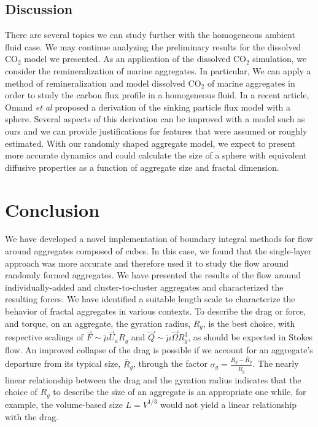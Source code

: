  \subsection{Discussion}
 
 There are several topics we can study further with the homogeneous ambient fluid case. We may continue analyzing the preliminary results for the dissolved CO$_2$ model we presented.
 As an application of the dissolved CO$_2$ simulation, we consider the remineralization of marine aggregates. In particular, We can apply a method of remineralization and model dissolved CO$_2$ of marine aggregates in order to study the carbon flux profile in a homogeneous fluid.
 In a recent article, Omand {\it{et al}} \cite{omand_sinking_2020} proposed a derivation of the sinking particle flux model with a sphere.
 Several aspects of this derivation can be improved with a model such as ours and we can provide justifications for features that were assumed or roughly estimated.
  With our randomly shaped aggregate model, we expect to present more accurate dynamics and could calculate the size of a sphere with equivalent diffusive properties as a function of aggregate size and fractal dimension.
\section{Conclusion}
\label{sec:conclusion}

We have developed a novel implementation of boundary integral methods for flow around aggregates composed of cubes. In this case, we found that the single-layer approach was more accurate and therefore used it to study the flow around randomly formed aggregates.
We have presented the results of the flow around individually-added and cluster-to-cluster aggregates and characterized the resulting forces. We have identified a suitable length scale to characterize the behavior of fractal aggregates in various contexts. To describe the drag or force, and torque, on an aggregate, the gyration radius, $R_g$, is the best choice, with respective scalings of $\vec{F} \sim \tilde{\mu} \vec{U}_a R_g$ and $\vec{Q} \sim \tilde{\mu} \vec{\Omega} R_g^3$, as should be expected in Stokes flow. 
An improved collapse of the drag is possible if we account for an aggregate's departure from its typical size, $\bar{R}_g$, through the factor $\sigma_g = \frac{R_g - \bar{R}_g}{\bar{R}_g}$. 
The nearly linear relationship between the drag and the gyration radius indicates that the choice of $R_g$ to describe the size of an aggregate is an appropriate one while, for example, the volume-based size $L=V^{1/3}$ would not yield a linear relationship with the drag.  



